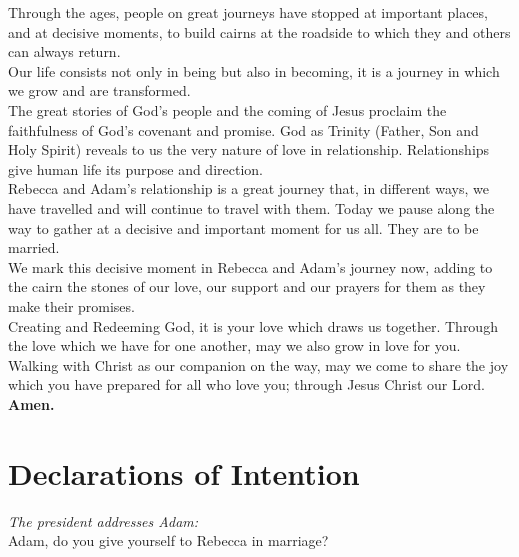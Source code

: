 \documentclass[a4paper,12pt,titlepage]{article}
\begin{document}
Through the ages, people on great journeys have stopped at important places, and at decisive moments, to build cairns at the roadside to which they and others can always return.\\

Our life consists not only in being but also in becoming, it is a journey in which we grow and are transformed.\\

The great stories of God’s people and the coming of Jesus proclaim the faithfulness of God’s covenant and promise. God as Trinity (Father, Son and Holy Spirit) reveals to us the very nature of love in relationship. Relationships give human life its purpose and direction.\\

Rebecca and Adam's relationship is a great journey that, in different ways, we have travelled and will continue to travel with them. Today we pause along the way to gather at a decisive and important moment for us all. They are to be married.\\

We mark this decisive moment in Rebecca and Adam's journey now, adding to the cairn the stones of our love, our support and our prayers for them as they make their promises.\\

Creating and Redeeming God,\newline
it is your love which draws us together.\newline
Through the love which we have for one another,\newline
may we also grow in love for you.\newline
Walking with Christ as our companion on the way,\newline
may we come to share the joy\newline
which you have prepared for all who love you;\newline
through Jesus Christ our Lord.\newline\newline
{\bf Amen.}

\clearpage 

\section{Declarations of Intention}

{\em The president addresses Adam:}\\
Adam, do you give yourself to Rebecca in marriage? \\
\end{document}
